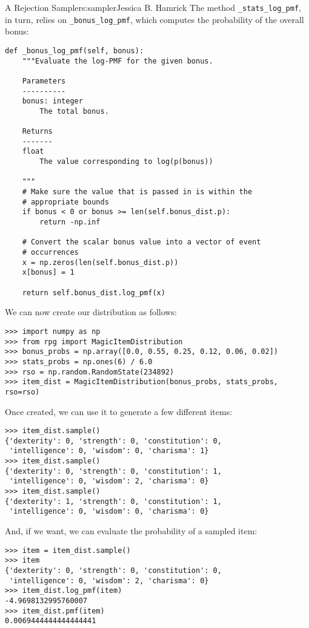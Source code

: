 \begin{aosachapter}{A Rejection Sampler}{s:sampler}{Jessica B. Hamrick}
The method \texttt{\_stats\_log\_pmf}, in turn, relies on
\texttt{\_bonus\_log\_pmf}, which computes the probability of the
overall bonus:

\begin{verbatim}
def _bonus_log_pmf(self, bonus):
    """Evaluate the log-PMF for the given bonus.

    Parameters
    ----------
    bonus: integer
        The total bonus.

    Returns
    -------
    float
        The value corresponding to log(p(bonus))

    """
    # Make sure the value that is passed in is within the
    # appropriate bounds
    if bonus < 0 or bonus >= len(self.bonus_dist.p):
        return -np.inf

    # Convert the scalar bonus value into a vector of event
    # occurrences
    x = np.zeros(len(self.bonus_dist.p))
    x[bonus] = 1

    return self.bonus_dist.log_pmf(x)
\end{verbatim}

We can now create our distribution as follows:

\begin{verbatim}
>>> import numpy as np
>>> from rpg import MagicItemDistribution
>>> bonus_probs = np.array([0.0, 0.55, 0.25, 0.12, 0.06, 0.02])
>>> stats_probs = np.ones(6) / 6.0
>>> rso = np.random.RandomState(234892)
>>> item_dist = MagicItemDistribution(bonus_probs, stats_probs, rso=rso)
\end{verbatim}

Once created, we can use it to generate a few different items:

\begin{verbatim}
>>> item_dist.sample()
{'dexterity': 0, 'strength': 0, 'constitution': 0, 
 'intelligence': 0, 'wisdom': 0, 'charisma': 1}
>>> item_dist.sample()
{'dexterity': 0, 'strength': 0, 'constitution': 1, 
 'intelligence': 0, 'wisdom': 2, 'charisma': 0}
>>> item_dist.sample()
{'dexterity': 1, 'strength': 0, 'constitution': 1, 
 'intelligence': 0, 'wisdom': 0, 'charisma': 0}
\end{verbatim}

And, if we want, we can evaluate the probability of a sampled item:

\begin{verbatim}
>>> item = item_dist.sample()
>>> item
{'dexterity': 0, 'strength': 0, 'constitution': 0, 
 'intelligence': 0, 'wisdom': 2, 'charisma': 0}
>>> item_dist.log_pmf(item)
-4.9698132995760007
>>> item_dist.pmf(item)
0.0069444444444444441
\end{verbatim}


\end{aosachapter}
